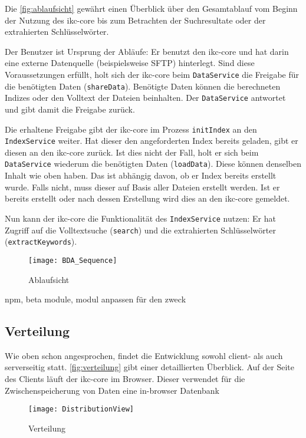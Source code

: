 Die \autoref{fig:ablaufsicht} gewährt einen Überblick über den Gesamtablauf vom Beginn der Nutzung des \gls{ikc-core} bis zum Betrachten der Suchresultate oder der extrahierten Schlüsselwörter. 

Der Benutzer ist Ursprung der Abläufe: Er benutzt den \gls{ikc-core} und hat darin eine externe Datenquelle (beispielsweise \gls{SFTP}) hinterlegt. Sind diese Voraussetzungen erfüllt, holt sich der \gls{ikc-core} beim \texttt{Da\-ta\-Ser\-vice} die Freigabe für die benötigten Daten (\texttt{shareData}). Benötigte Daten können die berechneten Indizes oder den Volltext der Dateien beinhalten. Der \texttt{DataService} antwortet und gibt damit die Freigabe zurück. 

Die erhaltene Freigabe gibt der \gls{ikc-core} im Prozess \texttt{initIndex} an den \texttt{IndexService} weiter. Hat dieser den angeforderten Index bereits geladen, gibt er diesen an den \gls{ikc-core} zurück. Ist dies nicht der Fall, holt er sich beim \texttt{Data\-Service} wiederum die benötigten Daten (\texttt{loadData}). Diese können denselben Inhalt wie oben haben. Das ist abhängig davon, ob er Index bereits erstellt wurde. Falls nicht, muss dieser auf Basis aller Dateien erstellt werden. Ist er bereits erstellt oder nach dessen Erstellung wird dies an den \gls{ikc-core} gemeldet.

Nun kann der \gls{ikc-core} die Funktionalität des \texttt{IndexService} nutzen: Er hat Zugriff auf die Volltextsuche (\texttt{search}) und die extrahierten Schlüsselwörter (\texttt{extractKeywords}). 

\begin{figure}[ht]
\centering
\texttt{[image: BDA\_Sequence]}
\caption{Ablaufsicht}
\label{fig:ablaufsicht}
\end{figure}

npm, beta module, modul anpassen für den zweck




\subsection{Verteilung}

Wie oben schon angesprochen, findet die Entwicklung sowohl client- als auch serverseitig statt. \autoref{fig:verteilung} gibt einer detaillierten Üb\-er\-blick. Auf der Seite des Clients läuft der \gls{ikc-core} im Browser. Dieser verwendet für die Zwischenspeicherung von Daten eine \gls{in-browser Datenbank}

    
        \begin{figure}[ht]
    \centering
    \texttt{[image: DistributionView]}
    \caption{Verteilung}
    \label{fig:verteilung}
    \end{figure}
